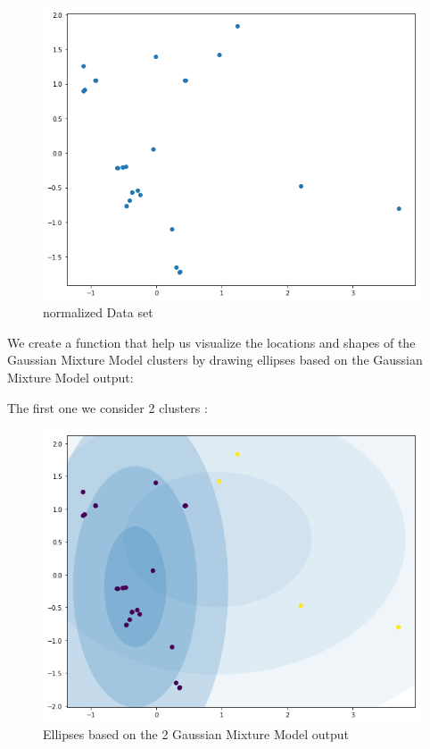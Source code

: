 \documentclass[12pt,twoside]{article}
\begin{document}
\begin{center}
	\begin{figure}
		\includegraphics[scale=0.7]{2.png}
		\caption{normalized Data set}	     
	\end{figure}
\end{center}

We create a function that help us visualize the locations and shapes of the Gaussian Mixture Model clusters by drawing ellipses based on the Gaussian Mixture Model output:

The first one we consider 2 clusters :
\begin{center}
	\begin{figure}
		\includegraphics[scale=0.7]{4.png}
		\caption{Ellipses based on the 2 Gaussian Mixture Model output}	     
	\end{figure}
\end{center}
\end{document}
